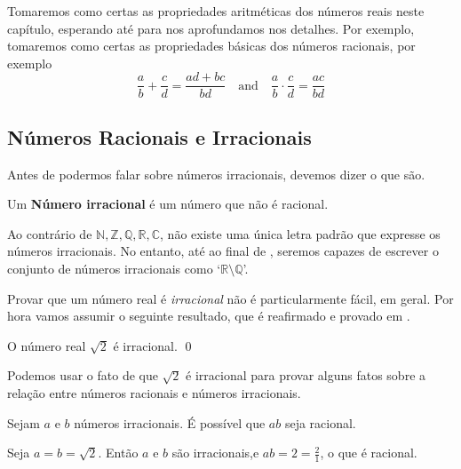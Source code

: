 Tomaremos como certas as propriedades aritméticas dos números reais neste capítulo, esperando até  para nos aprofundamos nos detalhes. Por exemplo, tomaremos como certas as propriedades básicas dos números racionais, por exemplo
\[ \frac{a}{b}+\frac{c}{d} = \frac{ad+bc}{bd} \quad \text{and} \quad \frac{a}{b} \cdot \frac{c}{d} = \frac{ac}{bd} \]

\subsection*{Números Racionais e Irracionais}
\label{pGettingStartedRationalNumbers}

Antes de podermos falar sobre números irracionais, devemos dizer o que são.

\begin{definition}
\label{defIrrationalNumber}
Um \textbf{Número irracional} é um número que não é racional.
\end{definition}

Ao contrário de $\mathbb{N},\mathbb{Z},\mathbb{Q},\mathbb{R},\mathbb{C}$, não existe uma única letra padrão que expresse os números irracionais. No entanto, até ao final de , seremos capazes de escrever o conjunto de números irracionais como `$\mathbb{R} \setminus \mathbb{Q}$'.

Provar que um número real é \textit{irracional} não é particularmente fácil, em geral. Por hora vamos assumir o seguinte resultado, que é reafirmado e provado em .

\begin{proposition}
\label{propSqrt2IrrationalPreliminary}
O número real $\sqrt{2}$ é irracional. \qed
\end{proposition}


Podemos usar o fato de que $\sqrt{2}$ é irracional para provar alguns fatos sobre a relação entre números racionais e números irracionais.

\begin{proposition}
Sejam $a$ e $b$ números irracionais. É possível que $ab$ seja racional.
\end{proposition}

\begin{cproof}
Seja $a=b=\sqrt{2}$. Então $a$ e $b$ são irracionais,e $ab=2=\frac{2}{1}$, o que é racional.
\end{cproof}

